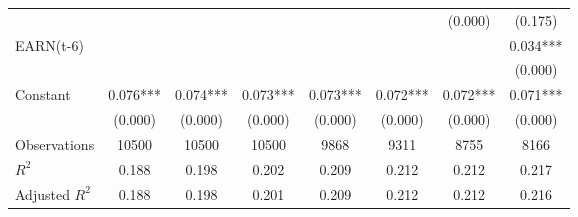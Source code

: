 {\begin{tabular}{l*{7}{c}}
                    &               &               &               &               &               &     (0.000)   &     (0.175)   \\
EARN(t-6)           &               &               &               &               &               &               &       0.034***\\
                    &               &               &               &               &               &               &     (0.000)   \\
Constant            &       0.076***&       0.074***&       0.073***&       0.073***&       0.072***&       0.072***&       0.071***\\
                    &     (0.000)   &     (0.000)   &     (0.000)   &     (0.000)   &     (0.000)   &     (0.000)   &     (0.000)   \\
\hline
Observations        &       10500   &       10500   &       10500   &        9868   &        9311   &        8755   &        8166   \\
\(R^{2}\)           &       0.188   &       0.198   &       0.202   &       0.209   &       0.212   &       0.212   &       0.217   \\
Adjusted \(R^{2}\)  &       0.188   &       0.198   &       0.201   &       0.209   &       0.212   &       0.212   &       0.216   \\
\hline\hline
\end{tabular}
}
